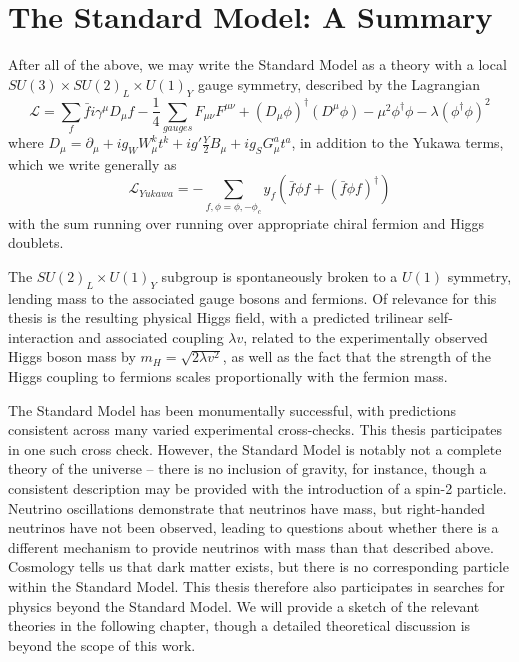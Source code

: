 \section{The Standard Model: A Summary}
After all of the above, we may write the Standard Model as a theory with a local $SU(3) \times SU(2)_{L} \times U(1)_{Y}$
gauge symmetry, described by the Lagrangian
\begin{equation}
\mathcal{L} = \sum\limits_{f} \bar{f}i\gamma^{\mu}D_{\mu}f -\frac{1}{4} \sum\limits_{gauges} F_{\mu\nu}F^{\mu\nu} +
 (D_{\mu}\phi)^{\dagger}(D^{\mu}\phi)-\mu^2\phi^{\dagger}\phi - \lambda(\phi^{\dagger}\phi)^2
\end{equation}
where $D_{\mu} = \partial_{\mu} + ig_{W}W_{\mu}^{k}t^{k} + ig'\frac{Y}{2}B_{\mu}+ig_{S}G_{\mu}^{a}t^{a}$, in 
addition to the Yukawa terms, which we write generally as 
\begin{equation}
\mathcal{L}_{Yukawa} = -\sum\limits_{f, \phi=\phi, -\phi_c} y_{f}(\bar{f}\phi f + (\bar{f}\phi f)^{\dagger})
\end{equation}
with the sum running over running over appropriate chiral fermion and Higgs doublets. 

The $SU(2)_{L} \times U(1)_{Y}$ subgroup is spontaneously broken to a $U(1)$ symmetry, lending mass to the
associated gauge bosons and fermions. Of relevance for this thesis is the resulting physical 
Higgs field, with a predicted trilinear self-interaction and associated coupling $\lambda v$, related 
to the experimentally observed Higgs boson mass by $m_{H} = \sqrt{2\lambda v^2}$, as well as the 
fact that the strength of the Higgs coupling to fermions scales proportionally with the fermion mass.

The Standard Model has been monumentally successful, with predictions consistent across many varied 
experimental cross-checks. This thesis participates in one such cross check. However, the Standard Model 
is notably not a complete theory of the universe -- there is no inclusion of gravity, for instance, though a 
consistent description may be provided with the introduction of a spin-2 particle. Neutrino oscillations 
demonstrate that neutrinos have mass, but right-handed neutrinos have not been observed, leading to questions about whether there is a different mechanism to provide neutrinos with mass than that described above. Cosmology 
tells us that dark matter exists, but there is no corresponding particle within the Standard Model. 
This thesis therefore also participates in searches for physics beyond the Standard Model. We will provide a sketch
of the relevant theories in the following chapter, though a detailed theoretical discussion is beyond the scope of 
this work.
